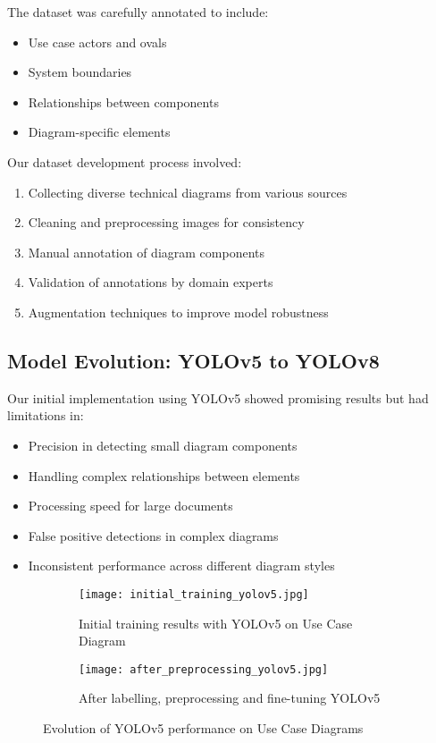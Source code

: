 \documentclass[conference]{IEEEtran}
\begin{document}
The dataset was carefully annotated to include:
\begin{itemize}
\item Use case actors and ovals
\item System boundaries
\item Relationships between components
\item Diagram-specific elements
\end{itemize}

Our dataset development process involved:
\begin{enumerate}
\item Collecting diverse technical diagrams from various sources
\item Cleaning and preprocessing images for consistency
\item Manual annotation of diagram components
\item Validation of annotations by domain experts
\item Augmentation techniques to improve model robustness
\end{enumerate}

\subsection{Model Evolution: YOLOv5 to YOLOv8}
Our initial implementation using YOLOv5 showed promising results but had limitations in:
\begin{itemize}
\item Precision in detecting small diagram components
\item Handling complex relationships between elements
\item Processing speed for large documents
\item False positive detections in complex diagrams
\item Inconsistent performance across different diagram styles
\end{itemize}

\begin{figure}[H]
\centering
\begin{subfigure}{.3\textwidth}
  \centering
  \texttt{[image: initial\_training\_yolov5.jpg]}
  \caption{Initial training results with YOLOv5 on Use Case Diagram}
  \label{fig:initial_yolov5}
\end{subfigure}
\begin{subfigure}{.3\textwidth}
  \centering
  \texttt{[image: after\_preprocessing\_yolov5.jpg]}
  \caption{After labelling, preprocessing and fine-tuning YOLOv5}
  \label{fig:finetuned_yolov5}
\end{subfigure}
\caption{Evolution of YOLOv5 performance on Use Case Diagrams}
\label{fig:yolov5_evolution}
\end{figure}
\end{document}
